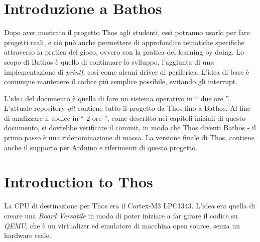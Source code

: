 \documentclass[a4paper,12pt]{report}
\begin{document}
\section{Introduzione a Bathos}

Dopo aver mostrato il progetto Thos agli studenti, essi potranno usarlo per fare progetti reali, e ciò può anche permettere di approfondire tematiche specifiche attraverso la pratica del gioco, ovvero con la pratica del learning by doing. Lo scopo di Bathos è quello di continuare lo sviluppo, l'aggiunta di una implementazione di \textit{printf}, così come alcuni driver di periferica. L'idea di base è comunque mantenere il codice più semplice possibile, evitando gli interrupt.



L'idea del documento è quella di fare un sistema operativo in `` due ore ''. L'attuale repository \textit{git} contiene tutto il progetto da Thos fino a Bathos. Al fine di analizzare il codice  in `` 2 ore '', come descritto nei capitoli iniziali di questo documento, si dovrebbe verificare il commit, in modo che Thos diventi Bathos - il primo passo è una ridenominazione di massa. La versione finale di Thos, contiene anche il supporto per Arduino e riferimenti di questo progetto. 

\section{Introduction to Thos}

La CPU di destinazione per Thos era il Cortex-M3 LPC1343. L'idea era quella di creare una \textit{Board Versatile} in modo di poter iniziare a far girare il codice su \textit{QEMU}, che è un virtualizer ed emulatore di macchina open source, senza un hardware reale.
\end{document}
